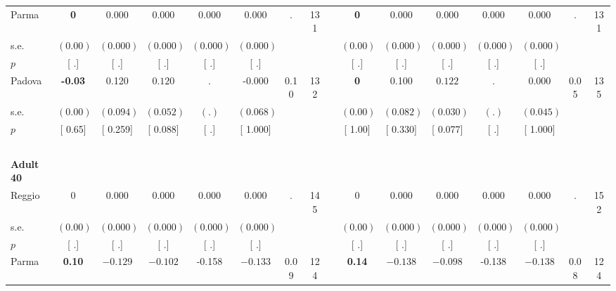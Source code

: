 \begin{longtable}{L{8em} c c c c c c c p{1em} c c c c c c c}
\quad \quad \quad Parma& \textbf{0} &     0.000 &     0.000 &     0.000 &     0.000 &         . &       131 & & \textbf{0} &     0.000 &     0.000 &     0.000 &     0.000 &         . &       131  \\*
\quad \quad \quad \quad s.e.& $ (     0.00)$ & $ (    0.000)$ & $ (    0.000)$ & $ (    0.000)$ & $ (    0.000)$ & & & & $ (     0.00)$ & $ (    0.000)$ & $ (    0.000)$ & $ (    0.000)$ & $ (    0.000)$ & &  \\*
\quad \quad \quad \quad $ p$ & [        .] & [        .] & [        .] & [        .] & [        .] & & & & [        .] & [        .] & [        .] & [        .] & [        .] & &  \\[1em]
\quad \quad \quad Padova& \textbf{    -0.03} &     0.120 & $ \mathbf{    0.120}$ &         . &    -0.000 &      0.10 &       132 & & \textbf{0} &     0.100 & $ \mathbf{    0.122}$ &         . &     0.000 &      0.05 &       135  \\*
\quad \quad \quad \quad s.e.& $ (     0.00)$ & $ (    0.094)$ & $ (    0.052)$ & $ (        .)$ & $ (    0.068)$ & & & & $ (     0.00)$ & $ (    0.082)$ & $ (    0.030)$ & $ (        .)$ & $ (    0.045)$ & &  \\*
\quad \quad \quad \quad $ p$ & [     0.65] & [    0.259] & [    0.088] & [        .] & [    1.000] & & & & [     1.00] & [    0.330] & [    0.077] & [        .] & [    1.000] & &  \\[1em]
~\\[1em]
\quad \quad \textbf{Adult 40} & & & & & & & & & & & & & & & \\* 
\quad \quad \quad Reggio& 0 &     0.000 &     0.000 &     0.000 &     0.000 &         . &       145 & & 0 &     0.000 &     0.000 &     0.000 &     0.000 &         . &       152  \\*
\quad \quad \quad \quad s.e.& $ (     0.00)$ & $ (    0.000)$ & $ (    0.000)$ & $ (    0.000)$ & $ (    0.000)$ & & & & $ (     0.00)$ & $ (    0.000)$ & $ (    0.000)$ & $ (    0.000)$ & $ (    0.000)$ & &  \\*
\quad \quad \quad \quad $ p$ & [        .] & [        .] & [        .] & [        .] & [        .] & & & & [        .] & [        .] & [        .] & [        .] & [        .] & &  \\[1em]
\quad \quad \quad Parma& \textbf{     0.10} & $ \mathbf{   -0.129}$ & $ \mathbf{   -0.102}$ &    -0.158 & $ \mathbf{   -0.133}$ &      0.09 &       124 & & \textbf{     0.14} & $ \mathbf{   -0.138}$ & $ \mathbf{   -0.098}$ &    -0.138 & $ \mathbf{   -0.138}$ &      0.08 &       124  \\*

\end{longtable}
